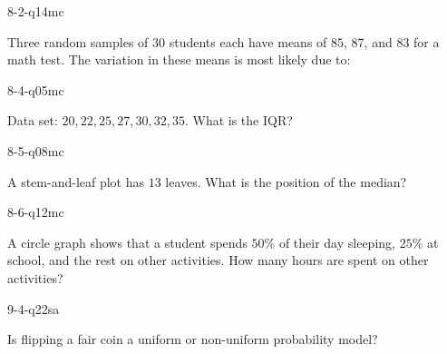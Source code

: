 \begin{practiceQuestion}{8-2-q14}{mc}
\begin{questionText}
Three random samples of $30$ students each have means of $85$, $87$, and $83$ for a math test. The variation in these means is most likely due to:
\end{questionText}
\end{practiceQuestion}

\begin{practiceQuestion}{8-4-q05}{mc}
\begin{questionText}
Data set: $20, 22, 25, 27, 30, 32, 35$. What is the IQR?
\end{questionText}
\end{practiceQuestion}

\begin{practiceQuestion}{8-5-q08}{mc}
\begin{questionText}
A stem-and-leaf plot has $13$ leaves. What is the position of the median?
\end{questionText}
\end{practiceQuestion}

\begin{practiceQuestion}{8-6-q12}{mc}
\begin{questionText}
A circle graph shows that a student spends $50\%$ of their day sleeping, $25\%$ at school, and the rest on other activities. How many hours are spent on other activities?
\end{questionText}
\end{practiceQuestion}

\begin{practiceQuestion}{9-4-q22}{sa}
\begin{questionText}
Is flipping a fair coin a uniform or non-uniform probability model?
\end{questionText}
\end{practiceQuestion}

